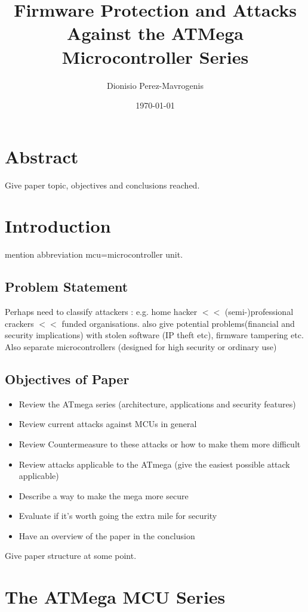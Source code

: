 \documentclass[12pt,a4paper,twocolumn]{article}
\author{Dionisio Perez-Mavrogenis}
\title{Firmware Protection and Attacks Against the ATMega Microcontroller Series}
\date{\today}
\begin{document}
	\maketitle
	
\section*{Abstract}
	Give paper topic, objectives and conclusions reached.
	

\section{Introduction}
	mention abbreviation mcu=microcontroller unit. 
	\subsection{Problem Statement}
	Perhaps need to classify attackers : e.g. home hacker $<<$ (semi-)professional crackers $<<$ funded organisations. also give potential problems(financial and security implications) with stolen software (IP theft etc), firmware tampering etc. Also separate microcontrollers (designed for high security or ordinary use)

	\subsection{Objectives of Paper}
	\begin{itemize}
	\item Review the ATmega series (architecture, applications and security features)\\
	\item Review current attacks against MCUs in general \\
	\item Review Countermeasure to these attacks or how to make them more difficult
	\item Review attacks applicable to the ATmega (give the easiest possible attack applicable)
	\item Describe a way to make the mega more secure
	\item Evaluate if it's worth going the extra mile for security
	\item Have an overview of the paper in the conclusion
	\end{itemize}
	
	Give paper structure at some point.
	

\section{The ATMega MCU Series}
\end{document}
